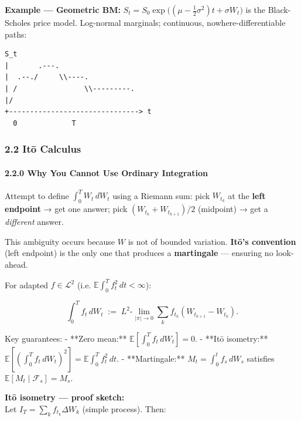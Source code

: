 \documentclass[11pt,a4paper]{article}
\begin{document}
\textbf{Example --- Geometric BM:} \(S_t = S_0 \exp\!\bigl((\mu-\tfrac12\sigma^2)t + \sigma W_t\bigr)\) is the Black-Scholes price model. Log-normal marginals; continuous, nowhere-differentiable paths:

\begin{verbatim}
S_t
|       .---.
|  .--./     \\----.
| /                \\---------.
|/
+-------------------------------> t
  0             T
\end{verbatim}

\subsubsection{2.2 Itō Calculus}\label{itux14d-calculus}

\paragraph{2.2.0 Why You Cannot Use Ordinary Integration}\label{why-you-cannot-use-ordinary-integration}

Attempt to define \(\int_0^T W_t\,dW_t\) using a Riemann sum: pick \(W_{t_k}\) at the \textbf{left endpoint} → get one answer; pick \((W_{t_k}+W_{t_{k+1}})/2\) (midpoint) → get a \emph{different} answer.

This ambiguity occurs because \(W\) is not of bounded variation. \textbf{Itō's convention} (left endpoint) is the only one that produces a \textbf{martingale} --- ensuring no look-ahead.

\begin{tcolorbox}[colback=defbg!60,colframe=optblue,fonttitle=\bfseries\sffamily,title={\textsf{\textbf{Definition}} — Definition — Itō Integral},breakable]
For adapted $f \in \mathcal{L}^2$ (i.e. $\mathbb{E}\!\int_0^T f_t^2\,dt < \infty$):

$$\int_0^T f_t\,dW_t \;:=\; L^2\text{-}\lim_{|\pi|\to 0} \sum_{k} f_{t_k}(W_{t_{k+1}}-W_{t_k}).$$

Key guarantees:
- **Zero mean:** $\mathbb{E}\!\left[\int_0^T f_t\,dW_t\right] = 0$.
- **Itō isometry:** $\mathbb{E}\!\left[\left(\int_0^T f_t\,dW_t\right)^2\right] = \mathbb{E}\!\int_0^T f_t^2\,dt$.
- **Martingale:** $M_t = \int_0^t f_s\,dW_s$ satisfies $\mathbb{E}[M_t\mid\mathcal{F}_s]=M_s$.
\end{tcolorbox}

\textbf{Itō isometry --- proof sketch:}\\
Let \(I_T = \sum_k f_{t_k}\Delta W_k\) (simple process). Then:
\end{document}
